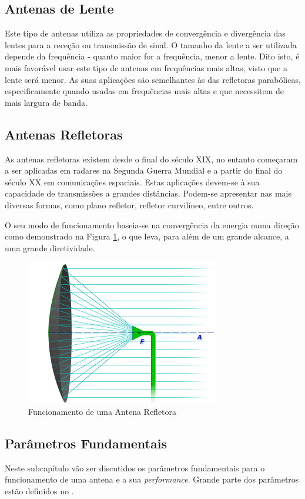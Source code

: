 \subsection*{Antenas de Lente}
Este tipo de antenas utiliza as propriedades de convergência e divergência das lentes para a receção ou transmissão de sinal. O tamanho da lente a ser utilizada depende da frequência - quanto maior for a frequência, menor a lente. Dito isto, é mais favorável usar este tipo de antenas em frequências mais altas, visto que a lente será menor. As suas aplicações são semelhantes às das refletoras parabólicas, especificamente quando usadas em frequências mais altas e que necessitem de mais largura de banda.

\subsection*{Antenas Refletoras}
As antenas refletoras existem desde o final do século XIX, no entanto começaram a ser aplicadas em radares na Segunda Guerra Mundial e a partir do final do século XX em comunicações espaciais. Estas aplicações devem-se à sua capacidade de transmissões a grandes distâncias. Podem-se apresentar nas mais diversas formas, como plano refletor, refletor curvilíneo, entre outros.\par 
O seu modo de funcionamento baseia-se na convergência da energia numa direção como demonstrado na Figura \ref{fig:reflector}, o que leva, para além de um grande alcance, a uma grande diretividade.

\begin{figure}[h]
\centering
\includegraphics[scale=0.6]{chapters/ch3/assets/reflector}
\decoRule
\caption[Antena Refletora]{Funcionamento de uma Antena Refletora}
\label{fig:reflector}
\end{figure}

\subsection{Parâmetros Fundamentais}
Neste subcapítulo vão ser discutidos os parâmetros fundamentais para o funcionamento de uma antena e a sua \textit{performance}. Grande parte dos parâmetros estão definidos no \parencite{IEEE1983}.

